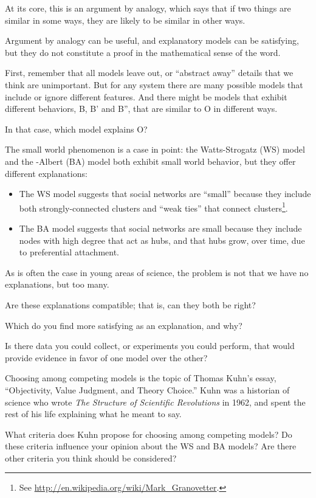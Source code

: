 \documentclass[10pt]{book}
\begin{document}
At its core, this is an argument by analogy, which says that if two
things are similar in some ways, they are likely to be similar in
other ways.

Argument by analogy can be useful, and explanatory models can be
satisfying, but they do not constitute a proof in the mathematical
sense of the word.

First, remember that all models leave out, or ``abstract away''
details that we think are unimportant.  But for any system there
are many possible models that include or ignore different features.
And there might be models that exhibit different behaviors,
B, B' and B'', that are similar to O in different ways.

In that case, which model explains O?

The small world phenomenon is a case in point: the
Watts-Strogatz (WS) model and the \Barabasi-Albert (BA) model
both exhibit small world behavior, but they offer different
explanations:

\begin{itemize}

\item The WS model suggests that social networks are ``small'' because
  they include both strongly-connected clusters and ``weak ties'' that
  connect clusters\footnote{See
    \url{http://en.wikipedia.org/wiki/Mark_Granovetter}.}.

\item The BA model suggests that social networks are small because
  they include nodes with high degree that act as hubs, and that
  hubs grow, over time, due to preferential attachment.

\end{itemize}

As is often the case in young areas of science, the problem is
not that we have no explanations, but too many.

\begin{ex}

Are these explanations compatible; that is, can they both be right?

Which do you find more satisfying as an explanation, and why?

Is there data you could collect, or experiments you could perform,
that would provide evidence in favor of one model over the other?

Choosing among competing models is the topic of Thomas Kuhn's
essay, ``Objectivity, Value Judgment, and Theory Choice.''
Kuhn was a historian of science who wrote {\em The
Structure of Scientific Revolutions} in 1962, and spent the rest of
his life explaining what he meant to say.

What criteria does Kuhn propose for choosing among competing models?
Do these criteria influence your opinion about the WS and BA models?
Are there other criteria you think should be considered?

\end{ex}
\end{document}
